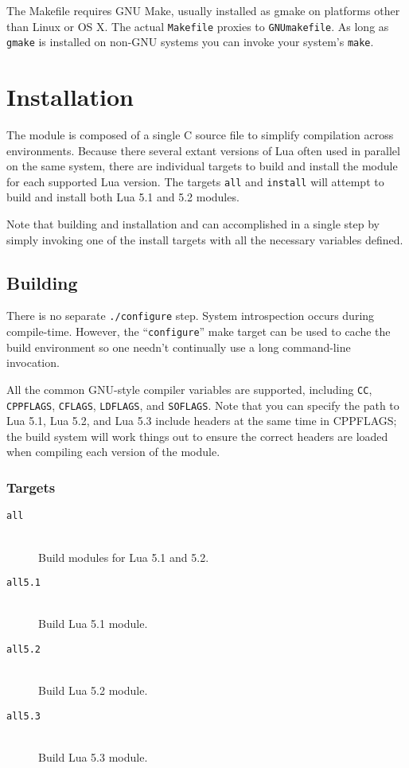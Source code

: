 \documentclass[11pt, oneside]{memoir}
\begin{document}
The Makefile requires GNU Make, usually installed as gmake on platforms other than Linux or OS X. The actual \texttt{Makefile} proxies to \texttt{GNUmakefile}. As long as \texttt{gmake} is installed on non-GNU systems you can invoke your system's \texttt{make}.

\chapter{Installation}

The module is composed of a single C source file to simplify compilation across environments. Because there several extant versions of Lua often used in parallel on the same system, there are individual targets to build and install the module for each supported Lua version. The targets \texttt{all} and \texttt{install} will attempt to build and install both Lua 5.1 and 5.2 modules.

Note that building and installation and can accomplished in a single step by simply invoking one of the install targets with all the necessary variables defined.

\section{Building}

There is no separate \texttt{./configure} step. System introspection occurs during compile-time. However, the ``\texttt{configure}'' make target can be used to cache the build environment so one needn't continually use a long command-line invocation.

All the common GNU-style compiler variables are supported, including \texttt{CC}, \texttt{CPPFLAGS}, \texttt{CFLAGS}, \texttt{LDFLAGS}, and \texttt{SOFLAGS}. Note that you can specify the path to Lua 5.1, Lua 5.2, and Lua 5.3 include headers at the same time in CPPFLAGS; the build system will work things out to ensure the correct headers are loaded when compiling each version of the module.

\subsection{Targets}

\begin{description}
\item[\texttt{all}] \hfill \\
Build modules for Lua 5.1 and 5.2.

\item[\texttt{all5.1}] \hfill \\
Build Lua 5.1 module.

\item[\texttt{all5.2}] \hfill \\
Build Lua 5.2 module.

\item[\texttt{all5.3}] \hfill \\
Build Lua 5.3 module.

\end{description}
\end{document}
